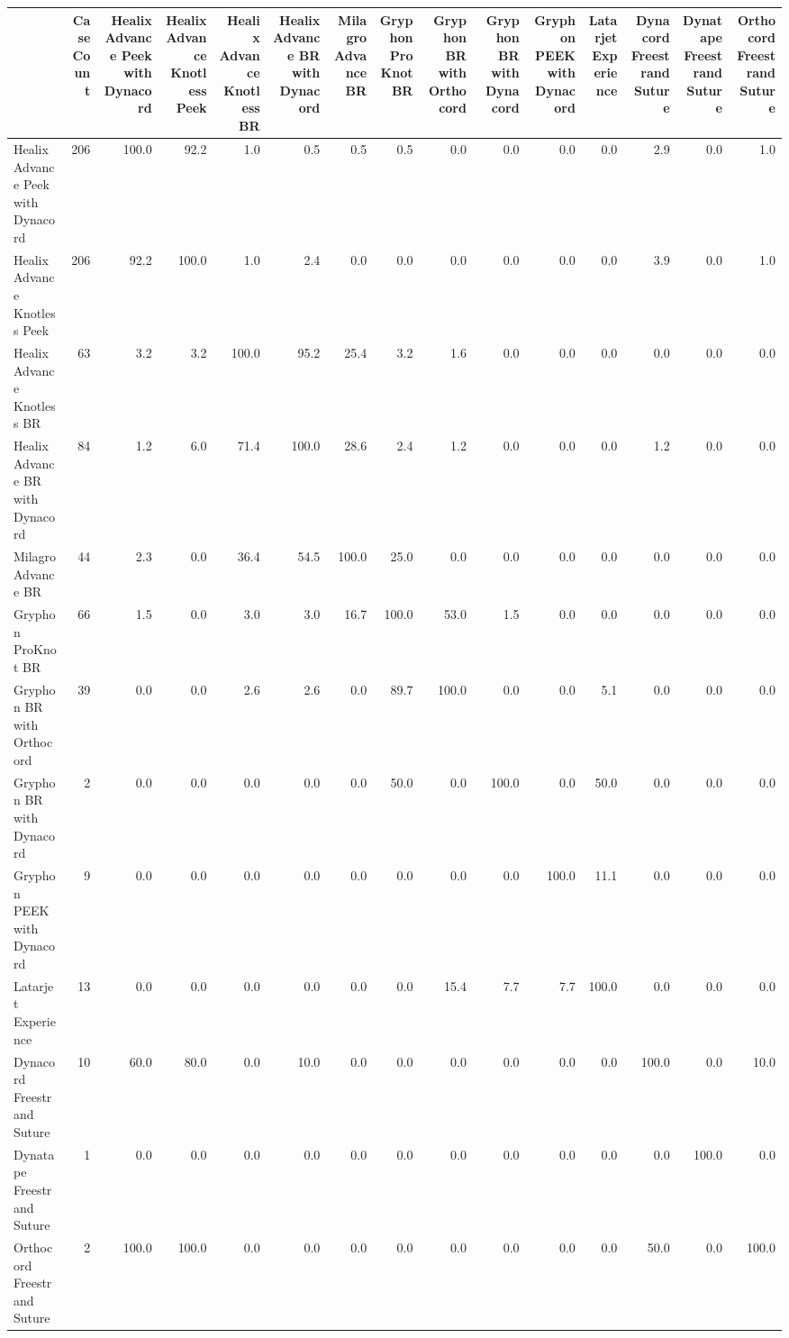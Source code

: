 \documentclass[
]{article}
\begin{document}
\begin{table}
{\fontsize{12.0pt}{14.0pt}\selectfont
\begin{tabular*}{\linewidth}{@{\extracolsep{\fill}}l|rrrrrrrrrrrrrr}
\toprule
 & CaseCount & Healix Advance Peek with Dynacord & Healix Advance Knotless Peek & Healix Advance Knotless BR & Healix Advance BR with Dynacord & Milagro Advance BR & Gryphon ProKnot BR & Gryphon BR with Orthocord & Gryphon BR with Dynacord & Gryphon PEEK with Dynacord & Latarjet Experience & Dynacord Freestrand Suture & Dynatape Freestrand Suture & Orthocord Freestrand Suture \\ 
\midrule\addlinespace[2.5pt]
Healix Advance Peek with Dynacord & 206 & 100.0 & 92.2 & 1.0 & 0.5 & 0.5 & 0.5 & 0.0 & 0.0 & 0.0 & 0.0 & 2.9 & 0.0 & 1.0 \\ 
Healix Advance Knotless Peek & 206 & 92.2 & 100.0 & 1.0 & 2.4 & 0.0 & 0.0 & 0.0 & 0.0 & 0.0 & 0.0 & 3.9 & 0.0 & 1.0 \\ 
Healix Advance Knotless BR & 63 & 3.2 & 3.2 & 100.0 & 95.2 & 25.4 & 3.2 & 1.6 & 0.0 & 0.0 & 0.0 & 0.0 & 0.0 & 0.0 \\ 
Healix Advance BR with Dynacord & 84 & 1.2 & 6.0 & 71.4 & 100.0 & 28.6 & 2.4 & 1.2 & 0.0 & 0.0 & 0.0 & 1.2 & 0.0 & 0.0 \\ 
Milagro Advance BR & 44 & 2.3 & 0.0 & 36.4 & 54.5 & 100.0 & 25.0 & 0.0 & 0.0 & 0.0 & 0.0 & 0.0 & 0.0 & 0.0 \\ 
Gryphon ProKnot BR & 66 & 1.5 & 0.0 & 3.0 & 3.0 & 16.7 & 100.0 & 53.0 & 1.5 & 0.0 & 0.0 & 0.0 & 0.0 & 0.0 \\ 
Gryphon BR with Orthocord & 39 & 0.0 & 0.0 & 2.6 & 2.6 & 0.0 & 89.7 & 100.0 & 0.0 & 0.0 & 5.1 & 0.0 & 0.0 & 0.0 \\ 
Gryphon BR with Dynacord & 2 & 0.0 & 0.0 & 0.0 & 0.0 & 0.0 & 50.0 & 0.0 & 100.0 & 0.0 & 50.0 & 0.0 & 0.0 & 0.0 \\ 
Gryphon PEEK with Dynacord & 9 & 0.0 & 0.0 & 0.0 & 0.0 & 0.0 & 0.0 & 0.0 & 0.0 & 100.0 & 11.1 & 0.0 & 0.0 & 0.0 \\ 
Latarjet Experience & 13 & 0.0 & 0.0 & 0.0 & 0.0 & 0.0 & 0.0 & 15.4 & 7.7 & 7.7 & 100.0 & 0.0 & 0.0 & 0.0 \\ 
Dynacord Freestrand Suture & 10 & 60.0 & 80.0 & 0.0 & 10.0 & 0.0 & 0.0 & 0.0 & 0.0 & 0.0 & 0.0 & 100.0 & 0.0 & 10.0 \\ 
Dynatape Freestrand Suture & 1 & 0.0 & 0.0 & 0.0 & 0.0 & 0.0 & 0.0 & 0.0 & 0.0 & 0.0 & 0.0 & 0.0 & 100.0 & 0.0 \\ 
Orthocord Freestrand Suture & 2 & 100.0 & 100.0 & 0.0 & 0.0 & 0.0 & 0.0 & 0.0 & 0.0 & 0.0 & 0.0 & 50.0 & 0.0 & 100.0 \\ 
\bottomrule
\end{tabular*}

}

\end{table}%
\end{document}

